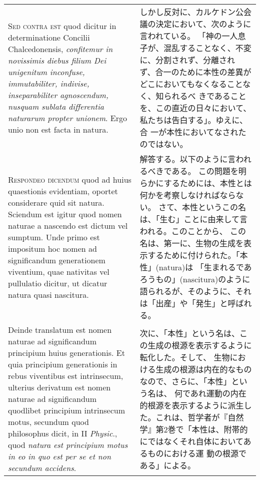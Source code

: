 \documentclass[10pt]{jsarticle} %
\begin{document}
\begin{longtable}{p{21em}p{21em}}
\\



{\scshape Sed contra est} quod dicitur in determinatione Concilii Chalcedonensis,
{\itshape confitemur in novissimis diebus filium Dei unigenitum inconfuse,
immutabiliter, indivise, inseparabiliter agnoscendum, nusquam sublata
differentia naturarum propter unionem}. Ergo unio non est facta in
natura.


&

しかし反対に、カルケドン公会議の決定において、次のように言われている。
 「神の一人息子が、混乱することなく、不変に、分割されず、分離され
 ず、合一のために本性の差異がどこにおいてもなくなることなく、知られるべ
 きであることを、この直近の日々において、私たちは告白する」。ゆえに、合
 一が本性においてなされたのではない。



\\

{\scshape Respondeo dicendum} quod ad huius quaestionis evidentiam, oportet
considerare quid sit natura. Sciendum est igitur quod nomen naturae a
nascendo est dictum vel sumptum. Unde primo est impositum hoc nomen ad
significandum generationem viventium, quae nativitas vel pullulatio
dicitur, ut dicatur natura quasi nascitura. 

&

解答する。以下のように言われるべきである。
この問題を明らかにするためには、本性とは何かを考察しなければならない。
さて、本性というこの名は、「生む」ことに由来して言われる。このことから、
 この名は、第一に、生物の生成を表示するために付けられた。「本性」(natura)は
「生まれるであろうもの」(nascitura)のように語られるが、そのように、それ
 は「出産」や「発生」と呼ばれる。


\\



Deinde translatum est nomen
naturae ad significandum principium huius generationis. Et quia
principium generationis in rebus viventibus est intrinsecum, ulterius
derivatum est nomen naturae ad significandum quodlibet principium
intrinsecum motus, secundum quod philosophus dicit, in II {\itshape Physic}., quod
{\itshape natura est principium motus in eo in quo est per se et non secundum
accidens}. 


&

次に、「本性」という名は、この生成の根源を表示するように転化した。そして、
 生物における生成の根源は内在的なものなので、さらに、「本性」という名は、
 何であれ運動の内在的根源を表示するように派生した。これは、哲学者が『自然
 学』第2巻で「本性は、附帯的にではなくそれ自体においてあるものにおける運
 動の根源である」による。



\end{longtable}
\end{document}
